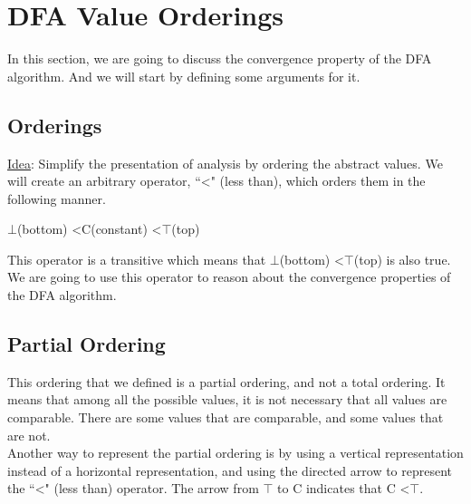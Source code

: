 
\clearpage
\section{DFA Value Orderings}

In this section, we are going to discuss the convergence property of the DFA algorithm. And we will start by defining some arguments for it. 

\subsection{Orderings}

\underline{Idea}: Simplify the presentation of analysis by ordering the abstract values. We will create an arbitrary operator, ``\textless" (less than), which orders them in the following manner.

\begin{center}
    $\bot$(bottom) \textless C(constant) \textless $\top$(top)
\end{center}

This operator is a transitive which means that $\bot$(bottom) \textless $\top$(top) is also true.\\ We are going to use this operator to reason about the convergence properties of the DFA algorithm.

\subsection{Partial Ordering}
This ordering that we defined is a partial ordering, and not a total ordering. It means that among all the possible values, it is not necessary that all values are comparable. There are some values that are comparable, and some values that are not.\\
Another way to represent the partial ordering is by using a vertical representation instead of a horizontal representation, and using the directed arrow to represent the ``\textless" (less than) operator. The arrow from $\top$ to C indicates that C \textless $\top$.

\begin{figure}[h!]
\begin {center}
\end{center}
\end{figure}


